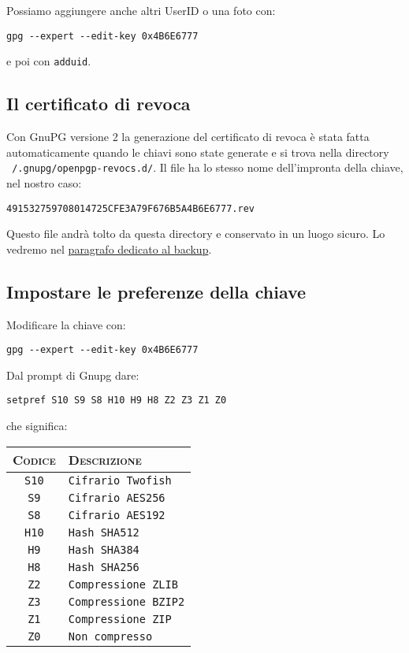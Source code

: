 \documentclass[a4paper,10pt]{article}
\begin{document}
Possiamo aggiungere anche altri UserID o una foto con:

\begin{verbatim}
gpg --expert --edit-key 0x4B6E6777
\end{verbatim}

e poi con \texttt{adduid}.

\subsection{Il certificato di revoca}
\label{sec:certificato-revoca}

Con GnuPG versione 2 la generazione del certificato di revoca è stata fatta automaticamente quando le chiavi sono state generate e si trova nella directory \texttt{~/.gnupg/openpgp-revocs.d/}. Il file ha lo stesso nome dell'impronta della chiave, nel nostro caso:

\begin{verbatim}
491532759708014725CFE3A79F676B5A4B6E6777.rev
\end{verbatim}

Questo file andrà tolto da questa directory e conservato in un luogo sicuro. Lo vedremo nel \hyperref[sec:backup-certificato-revoca]{paragrafo dedicato al backup}.

\subsection{Impostare le preferenze della chiave}

Modificare la chiave con:

\begin{verbatim}
gpg --expert --edit-key 0x4B6E6777
\end{verbatim}

Dal prompt di Gnupg dare:

\begin{verbatim}
setpref S10 S9 S8 H10 H9 H8 Z2 Z3 Z1 Z0
\end{verbatim}

che significa:

\begin{table}[h!]
	\begin{tabular}{cl}
 		\hline
		\textsc{Codice} & \textsc{Descrizione} \\
		\hline
		\texttt{S10} & \texttt{Cifrario Twofish} \\
		\texttt{S9} & \texttt{Cifrario AES256} \\
		\texttt{S8} & \texttt{Cifrario AES192} \\
		\texttt{H10} & \texttt{Hash SHA512} \\
		\texttt{H9} & \texttt{Hash SHA384} \\
		\texttt{H8} & \texttt{Hash SHA256} \\
		\texttt{Z2} & \texttt{Compressione ZLIB} \\
		\texttt{Z3} & \texttt{Compressione BZIP2} \\
		\texttt{Z1} & \texttt{Compressione ZIP} \\
		\texttt{Z0} & \texttt{Non compresso} \\
		\hline
	\end{tabular}
\end{table}
\end{document}
